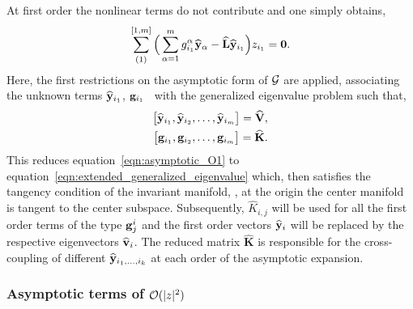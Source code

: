 At first order the nonlinear terms do not contribute and one simply obtains,
\begin{align}
		\label{eqn:asymptotic_O1}
		\sum^{[1,m]}_{(1)}\Big( \sum^{m}_{\alpha=1}g^{\alpha}_{i_{1}}\widehat{\mathbf{y}}_{\alpha} - \mathbf{\widehat{L}}\widehat{\mathbf{y}}_{i_{1}} \Big)z_{i_{1}} = \mathbf{0}.
\end{align}
Here, the first restrictions on the asymptotic form of $\mathcal{G}$ are applied, associating the unknown terms $\widehat{\mathbf{y}}_{i_{1}}$, $\mathbf{g}_{i_{1}}$ \etc\ with the generalized eigenvalue problem such that,
\begin{subequations}
	\label{eqn:GEV_O1}
	\begin{align}
		\begin{bmatrix} \widehat{\mathbf{y}}_{i_{1}}, \widehat{\mathbf{y}}_{i_{2}},\ldots,\widehat{\mathbf{y}}_{i_{m}}\end{bmatrix} = \widehat{\mathbf{V}}, \\
		\begin{bmatrix} \mathbf{g}_{i_{1}}, \mathbf{g}_{i_{2}},\ldots,\mathbf{g}_{i_{m}}\end{bmatrix} = \mathbf{\widehat{K}}.
	\end{align}
\end{subequations}
This reduces equation~\eqref{eqn:asymptotic_O1} to equation~\eqref{eqn:extended_generalized_eigenvalue} which, then satisfies the tangency condition of the invariant manifold, \ie, at the origin the center manifold is tangent to the center subspace. Subsequently, $\widehat{K}_{i,j}$ will be used for all the first order terms of the type $\mathbf{g}^{i}_{j}$ and the first order vectors $\widehat{\mathbf{y}}_{i}$ will be replaced by the respective eigenvectors $\widehat{\mathbf{v}}_{i}$. The reduced matrix $\mathbf{\widehat{K}}$ is responsible for the cross-coupling of different $\widehat{\mathbf{y}}_{i_{1},\ldots,i_{k}}$ at each order of the asymptotic expansion. 

\subsubsection{Asymptotic terms of $\mathcal{O}(|z|^{2})$}
\label{sec:normal_form_O2}


